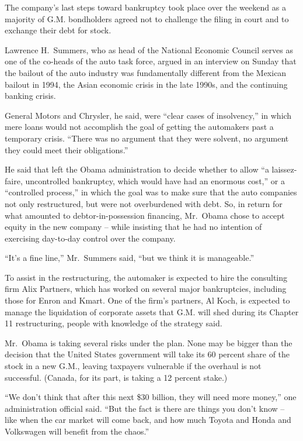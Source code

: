 \documentclass[12pt,a4paper,onecolumn]{article}
\begin{document}
The company's last steps toward bankruptcy took place over the weekend as a majority of G.M.
bondholders agreed not to challenge the filing in court and to exchange their debt for stock.

Lawrence H.~Summers, who as head of the National Economic Council serves as one of the co-heads of
the auto task force, argued in an interview on Sunday that the bailout of the auto industry was
fundamentally different from the Mexican bailout in 1994, the Asian economic crisis in the late
1990s, and the continuing banking crisis.

General Motors and Chrysler, he said, were ``clear cases of insolvency,'' in which mere loans would
not accomplish the goal of getting the automakers past a temporary crisis. ``There was no argument
that they were solvent, no argument they could meet their obligations.''

He said that left the Obama administration to decide whether to allow ``a laissez-faire,
uncontrolled bankruptcy, which would have had an enormous cost,'' or a ``controlled process,'' in
which the goal was to make sure that the auto companies not only restructured, but were not
overburdened with debt. So, in return for what amounted to debtor-in-possession financing, Mr.~Obama
chose to accept equity in the new company -- while insisting that he had no intention of exercising
day-to-day control over the company.

``It's a fine line,'' Mr.~Summers said, ``but we think it is manageable.''

To assist in the restructuring, the automaker is expected to hire the consulting firm Alix Partners,
which has worked on several major bankruptcies, including those for Enron and Kmart. One of the
firm's partners, Al Koch, is expected to manage the liquidation of corporate assets that G.M. will
shed during its Chapter 11 restructuring, people with knowledge of the strategy said.

Mr.~Obama is taking several risks under the plan. None may be bigger than the decision that the
United States government will take its 60 percent share of the stock in a new G.M., leaving
taxpayers vulnerable if the overhaul is not successful. (Canada, for its part, is taking a 12
percent stake.)

``We don't think that after this next \$30 billion, they will need more money,'' one administration
official said. ``But the fact is there are things you don't know -- like when the car market will
come back, and how much Toyota and Honda and Volkswagen will benefit from the chaos.''
\end{document}
